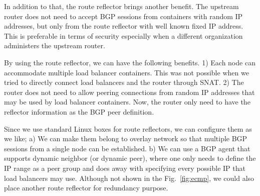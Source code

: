 In addition to that, the route reflector brings another benefit.
The upstream router does not need to accept BGP sessions from containers with random IP addresses, but only from the route reflector with well known fixed IP address.
This is preferable in terms of security especially when a different organization administers the upstream router.

By using the route reflector, we can have the following benefits.
1) Each node can accommodate multiple load balancer containers. This was not possible when we tried to directly connect load balancers and the router through SNAT.
2) The router does not need to allow peering connections from random IP addresses that may be used by load balancer containers. Now, the router only need to have the reflector information as the BGP peer definition.

Since we use standard Linux boxes for route reflectors, we can configure them as we like;
a) We can make them belong to overlay network so that multiple BGP sessions from a single node can be established.
b) We can use a BGP agent that supports dynamic neighbor (or dynamic peer), where one only needs to define the IP range as a peer group and does away with specifying every possible IP that load balancers may use.
Although not shown in the Fig.~\ref{fig:ecmp}, we could also place another route reflector for redundancy purpose.


\FloatBarrier


